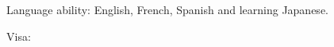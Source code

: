 
\begin{rlist}
  \item Language ability: English, French, Spanish and learning Japanese.
  \item Visa: \visa 
\end{rlist}

